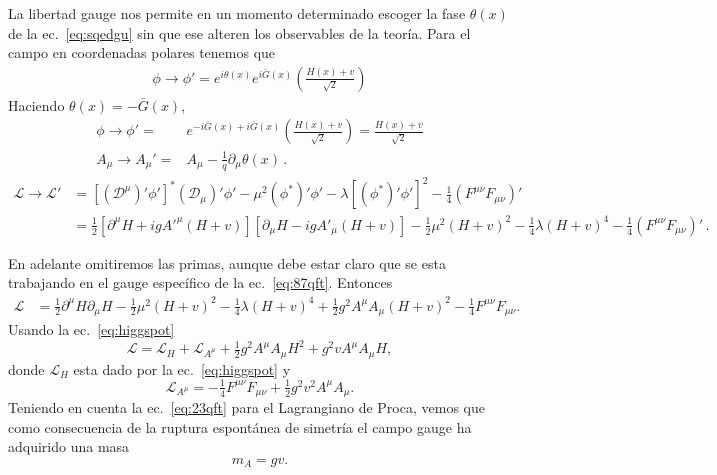 \begin{frame}
La libertad gauge nos permite en un momento determinado escoger la fase $\theta(x)$ de la ec.~\eqref{eq:sqedgu} sin que ese alteren los observables de la teoría. Para el campo en coordenadas polares tenemos que
\begin{align*}
     \phi\to\phi'=e^{i\theta(x)}e^{i\bar{G}(x)}\left(\frac{H(x)+v}{\sqrt{2}}\right)
\end{align*}
Haciendo $\theta(x)=-\bar{G}(x)$,
\begin{align}
\label{eq:87qft}
   \phi\to\phi'=&e^{-i\bar{G}(x)+i\bar{G}(x)}\left(\frac{H(x)+v}{\sqrt{2}}\right)=\frac{H(x)+v}{\sqrt{2}} \nonumber\\
   A_{\mu}\to A_{\mu}'=&A_{\mu}-\frac{1}{q}\partial_{\mu}\theta(x)\,.
\end{align}
\begin{align}
  \mathcal{L}\to\mathcal{L}' &=\left[\left(\mathcal{D}^\mu\right)'\phi'\right]^*\left(\mathcal{D}_\mu\right)'\phi'-\mu^2\left(\phi^*\right)'\phi'-\lambda\left[\left(\phi^*\right)'\phi'\right]^2-\tfrac{1}{4}\left(F^{\mu\nu}F_{\mu\nu}\right)'\nonumber\\
 &=\tfrac{1}{2}\left[\partial^\mu H+ig{A'}^\mu(H+v)\right]\left[\partial_\mu H-ig{A'}_\mu(H+v)\right]-\tfrac{1}{2}\mu^2(H+v)^2-\tfrac{1}{4}\lambda(H+v)^4-\tfrac{1}{4}\left(F^{\mu\nu}F_{\mu\nu}\right)'\,.
\end{align}

En adelante omitiremos las primas, aunque debe estar claro que se esta trabajando en el gauge específico de la ec.~\eqref{eq:87qft}. Entonces
\begin{align}
  \mathcal{L}&=\tfrac{1}{2}\partial^\mu H\partial_\mu H-\tfrac{1}{2}\mu^2(H+v)^2-
  \tfrac{1}{4}\lambda(H+v)^4+\tfrac{1}{2}g^2A^\mu A_\mu(H+v)^2
  -\tfrac{1}{4}F^{\mu\nu}F_{\mu\nu}.
\end{align}
Usando la ec.~\eqref{eq:higgspot}
\begin{equation}
  \label{eq:94qft}
  \mathcal{L}=\mathcal{L}_H+\mathcal{L}_{A^\mu}+\tfrac{1}{2}g^2A^\mu A_\mu H^2+g^2vA^\mu A_\mu H,
\end{equation}
donde $\mathcal{L}_H$ esta dado por la ec.~\eqref{eq:higgspot} y
\begin{equation}
  \mathcal{L}_{A^\mu}=-\tfrac{1}{4}F^{\mu\nu}F_{\mu\nu}+\tfrac{1}{2}g^2v^2A^\mu A_\mu.
\end{equation}
Teniendo en cuenta la ec.~\eqref{eq:23qft} para el Lagrangiano de Proca, vemos que como consecuencia de la ruptura espontánea de simetría el campo gauge ha adquirido una masa
\begin{equation}
  m_{A}=gv.
\end{equation}


\end{frame}

